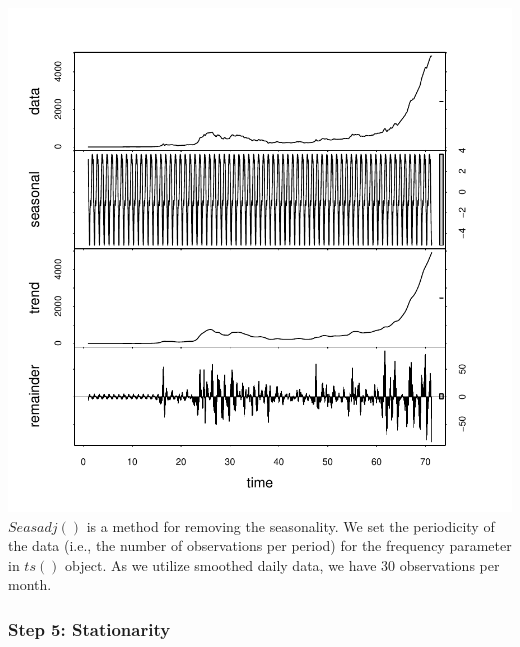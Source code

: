 \documentclass{article}
\begin{document}
\begin{Schunk}
\end{Schunk}
\includegraphics{Report-015}
$Seasadj()$ is a method for removing the seasonality. We set the periodicity of the data (i.e., the number of observations per period) for the frequency parameter in $ts()$ object. As we utilize smoothed daily data, we have 30 observations per month.

\subsubsection*{Step 5: Stationarity}
\end{document}

